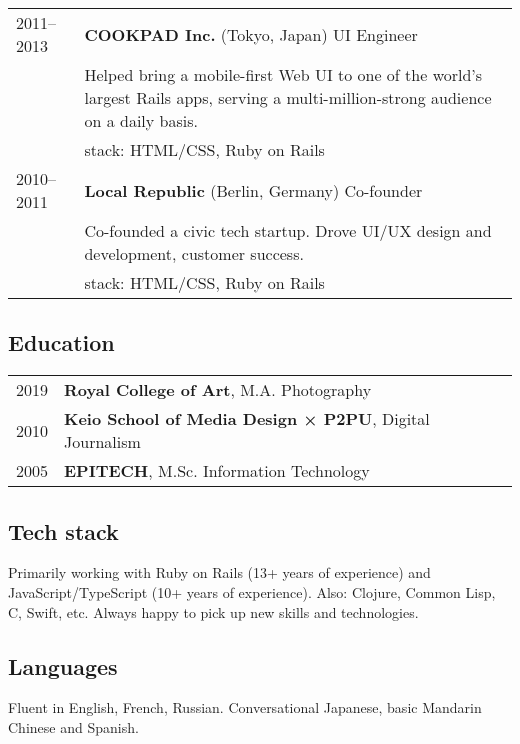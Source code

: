 \documentclass[a4paper,11pt]{article}
\def\companystrut{\rule{0pt}{1.2\normalbaselineskip}}
\def\descriptionstrut{\rule{0pt}{0.9\normalbaselineskip}}
\begin{document}
\begin{tabular}{ p{4.5em} p{41.5em} }
  2011–2013\companystrut & \textbf{COOKPAD Inc.} (Tokyo, Japan) UI Engineer\\
           & \descriptionstrut Helped bring a mobile-first Web UI to
             one of the world’s largest Rails apps, serving a multi-million-strong audience on
             a daily basis.\\
           & {\sc stack:} HTML/CSS, Ruby on Rails\\

  2010–2011\companystrut & \textbf{Local Republic} (Berlin, Germany) Co-founder\\
           & \descriptionstrut Co-founded a civic tech startup. Drove UI/UX design and development,
             customer success.\\
           & {\sc stack:} HTML/CSS, Ruby on Rails\\
\end{tabular}

\subsection*{Education}

\begin{tabular}{ p{4.5em} p{30em} }
  2019 & \textbf{Royal College of Art}, M.A. Photography\\
  2010\descriptionstrut & \textbf{Keio School of Media Design × P2PU}, Digital Journalism\\
  2005\descriptionstrut & \textbf{EPITECH}, M.Sc. Information Technology\\
\end{tabular}

\subsection*{Tech stack}

Primarily working with Ruby on Rails (13+ years of experience) and
JavaScript/TypeScript (10+ years of experience). Also: Clojure, Common Lisp, C,
Swift, etc. Always happy to pick up new skills and technologies.

\subsection*{Languages}

Fluent in English, French, Russian. Conversational Japanese, basic Mandarin
Chinese and Spanish.
\end{document}
